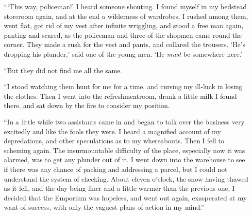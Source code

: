 “\kern1pt‘This way, policeman!’ I heard someone shouting. I found myself in my bedstead storeroom again, and at the end a wilderness of wardrobes. I rushed among them, went flat, got rid of my vest after infinite wriggling, and stood a free man again, panting and scared, as the policeman and three of the shopmen came round the corner. They made a rush for the vest and pants, and collared the trousers. ‘He’s dropping his plunder,’ said one of the young men. ‘He \emph{must} be somewhere here.’

“But they did not find me all the same.

“I stood watching them hunt for me for a time, and cursing my ill-luck in losing the clothes. Then I went into the refreshmentroom, drank a little milk I found there, and sat down by the fire to consider my position.

“In a little while two assistants came in and began to talk over the business very excitedly and like the fools they were. I heard a magnified account of my depredations, and other speculations as to my whereabouts. Then I fell to scheming again. The insurmountable difficulty of the place, especially now it was alarmed, was to get any plunder out of it. I went down into the warehouse to see if there was any chance of packing and addressing a parcel, but I could not understand the system of checking. About eleven o’clock, the snow having thawed as it fell, and the day being finer and a little warmer than the previous one, I decided that the Emporium was hopeless, and went out again, exasperated at my want of success, with only the vaguest plans of action in my mind.”